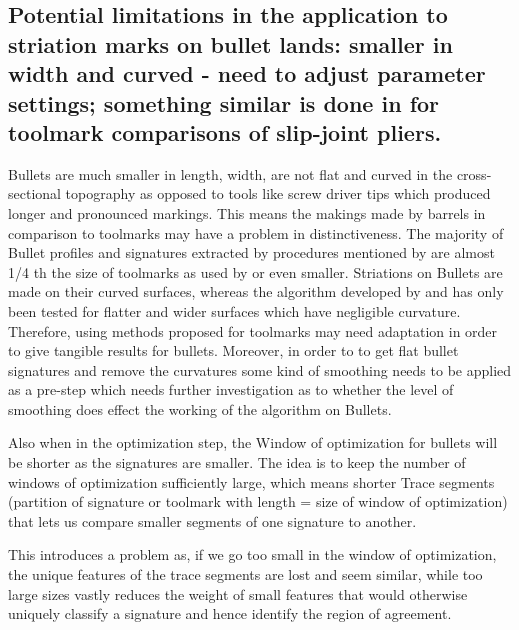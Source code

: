 \documentclass[12pt]{article}
\begin{document}
\subsection{\texorpdfstring{Potential limitations in the application to
striation marks on bullet lands: smaller in width and curved - need to
adjust parameter settings; something similar is done in
\citet{afte-chumbley} for toolmark comparisons of slip-joint
pliers.}{Potential limitations in the application to striation marks on bullet lands: smaller in width and curved - need to adjust parameter settings; something similar is done in  for toolmark comparisons of slip-joint pliers.}}\label{potential-limitations-in-the-application-to-striation-marks-on-bullet-lands-smaller-in-width-and-curved---need-to-adjust-parameter-settings-something-similar-is-done-in-for-toolmark-comparisons-of-slip-joint-pliers.}

Bullets are much smaller in length, width, are not flat and curved in
the cross-sectional topography as opposed to tools like screw driver
tips which produced longer and pronounced markings. This means the
makings made by barrels in comparison to toolmarks may have a problem in
distinctiveness. The majority of Bullet profiles and signatures
extracted by procedures mentioned by \citet{aoas} are almost 1/4 th the
size of toolmarks as used by \citet{chumbley} or even smaller.
Striations on Bullets are made on their curved surfaces, whereas the
algorithm developed by \citet{chumbley} and \citet{hadler} has only been
tested for flatter and wider surfaces which have negligible curvature.
Therefore, using methods proposed for toolmarks may need adaptation in
order to give tangible results for bullets. Moreover, in order to to get
flat bullet signatures and remove the curvatures some kind of smoothing
needs to be applied as a pre-step which needs further investigation as
to whether the level of smoothing does effect the working of the
algorithm on Bullets.

Also when in the optimization step, the Window of optimization for
bullets will be shorter as the signatures are smaller. The idea is to
keep the number of windows of optimization sufficiently large, which
means shorter Trace segments (partition of signature or toolmark with
length = size of window of optimization) that lets us compare smaller
segments of one signature to another.

This introduces a problem as, if we go too small in the window of
optimization, the unique features of the trace segments are lost and
seem similar, while too large sizes vastly reduces the weight of small
features that would otherwise uniquely classify a signature and hence
identify the region of agreement.
\end{document}
